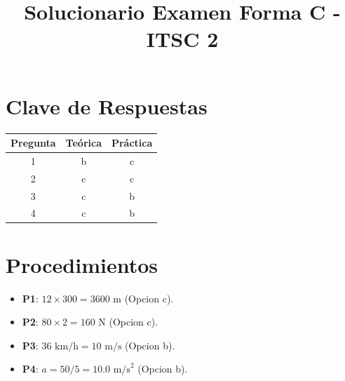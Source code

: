 \documentclass[12pt]{article}
\title{Solucionario Examen Forma C - ITSC 2}
\date{}
\begin{document}
\maketitle

\section*{Clave de Respuestas}

\begin{table}[h]
\centering
\begin{tabular}{|c|c|c|}
\hline
\textbf{Pregunta} & \textbf{Teórica} & \textbf{Práctica} \\ \hline
1 & b & c \\ \hline
2 & c & c \\ \hline
3 & c & b \\ \hline
4 & c & b \\ \hline
\end{tabular}
\end{table}

\section*{Procedimientos}

\begin{itemize}
    \item \textbf{P1}: $12 \times 300 = 3600 \text{ m}$ (Opcion c).
    \item \textbf{P2}: $80 \times 2 = 160 \text{ N}$ (Opcion c).
    \item \textbf{P3}: $36 \text{ km/h} = 10 \text{ m/s}$ (Opcion b).
    \item \textbf{P4}: $a = 50/5 = 10.0 \text{ m/s}^2$ (Opcion b).
\end{itemize}
\end{document}
